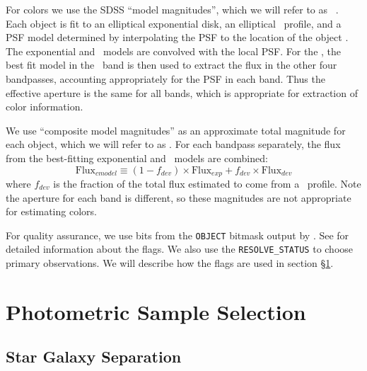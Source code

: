 \documentclass[preprint]{aastex}
\begin{document}
For colors we use the SDSS ``model magnitudes'', which we will refer to as
\modelmag\ \citep{dr7photo}.  Each object is fit to an elliptical exponential
disk, an elliptical \devauc\ profile, and a PSF model determined by
interpolating the PSF to the location of the
object \citep{LuptonADASS01,Sheldon04}.  The exponential and \devauc\ models are
convolved with the local PSF.  For the \modelmag, the best fit model in the
\rmag\ band is then used to extract the flux in the other four bandpasses,
accounting appropriately for the PSF in each band. Thus the effective aperture
is the same for all bands, which is appropriate for extraction of color
information.

We use ``composite model magnitudes'' as an approximate total magnitude for
each object, which we will refer to as \cmodelmag.  For each bandpass
separately, the flux from the best-fitting exponential and \devauc\ models are
combined:
\begin{equation}
\textrm{Flux}_{cmodel} \equiv (1-f_{dev})\times \textrm{Flux}_{exp} + f_{dev} \times \textrm{Flux}_{dev}
\end{equation}
where $f_{dev}$ is the fraction of the total flux estimated to come from a
\devauc\ profile\citep{dr7photo}.  Note the aperture for each band is
different, so these magnitudes are not appropriate for estimating colors.

For quality assurance, we use bits from the \texttt{OBJECT} bitmask output by
\photo.  See \citet{dr7flags} for detailed information about the flags.    We
also use the \texttt{RESOLVE\_STATUS} \citep{dr7resolve} to choose primary
observations.  We will describe how the flags are used in section \S \ref{sec:select}.

    

\section{Photometric Sample Selection} \label{sec:select}

\subsection{Star Galaxy Separation}
\end{document}
